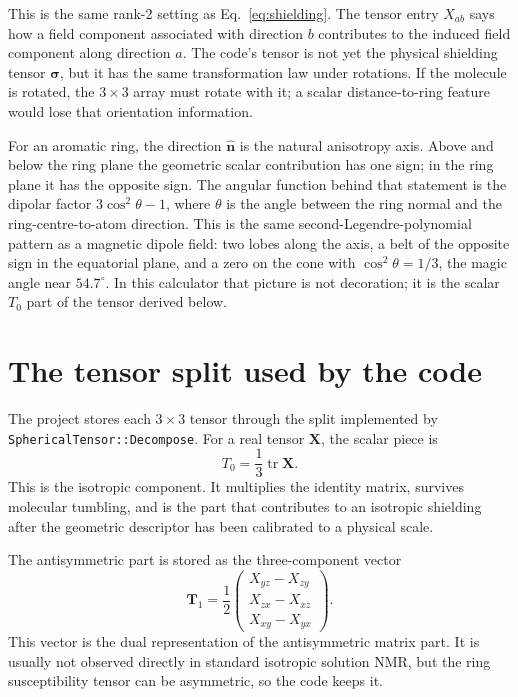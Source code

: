\documentclass[11pt]{article}
\begin{document}
This is the same rank-2 setting as Eq.~\eqref{eq:shielding}. The tensor entry
\(X_{ab}\) says how a field component associated with direction \(b\) contributes
to the induced field component along direction \(a\). The code's tensor is not
yet the physical shielding tensor \(\bm\sigma\), but it has the same
transformation law under rotations. If the molecule is rotated, the \(3\times3\)
array must rotate with it; a scalar distance-to-ring feature would lose that
orientation information.

For an aromatic ring, the direction \(\hat{\bm n}\) is the natural anisotropy
axis. Above and below the ring plane the geometric scalar contribution has one
sign; in the ring plane it has the opposite sign. The angular function behind
that statement is the dipolar factor \(3\cos^2\theta-1\), where \(\theta\) is
the angle between the ring normal and the ring-centre-to-atom direction. This is
the same second-Legendre-polynomial pattern as a magnetic dipole field: two
lobes along the axis, a belt of the opposite sign in the equatorial plane, and a
zero on the cone with \(\cos^2\theta=1/3\), the magic angle near
\(54.7^\circ\). In this calculator that picture is not decoration; it is the
scalar \(T_0\) part of the tensor derived below.

\section{The tensor split used by the code}

The project stores each \(3\times3\) tensor through the split implemented by
\texttt{SphericalTensor::Decompose}. For a real tensor \(\bm X\), the scalar
piece is
\begin{equation}
  T_0 = \frac{1}{3}\operatorname{tr}\bm X .
  \label{eq:t0}
\end{equation}
This is the isotropic component. It multiplies the identity matrix, survives
molecular tumbling, and is the part that contributes to an isotropic shielding
after the geometric descriptor has been calibrated to a physical scale.

The antisymmetric part is stored as the three-component vector
\begin{equation}
  \bm T_1 =
  \frac{1}{2}
  \begin{pmatrix}
    X_{yz}-X_{zy}\\
    X_{zx}-X_{xz}\\
    X_{xy}-X_{yx}
  \end{pmatrix}.
  \label{eq:t1}
\end{equation}
This vector is the dual representation of the antisymmetric matrix part. It is
usually not observed directly in standard isotropic solution NMR, but the ring
susceptibility tensor can be asymmetric, so the code keeps it.
\end{document}
